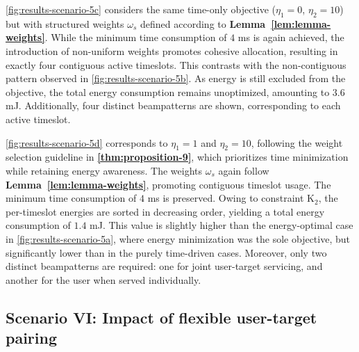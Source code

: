 \documentclass[10pt,journal,compsoc]{IEEEtran}
\theoremstyle{myremark}
\theoremstyle{myexample}
\begin{document}
 


\cref{fig:results-scenario-5c} considers the same time-only objective ($ \eta_1 = 0 $, $ \eta_2 = 10 $) but with structured weights $ \omega_s $ defined according to \textbf{Lemma~\ref{lem:lemma-weights}}. While the minimum time consumption of $ 4 $ ms is again achieved, the introduction of non-uniform weights promotes cohesive allocation, resulting in exactly four contiguous active timeslots. This contrasts with the non-contiguous pattern observed in \cref{fig:results-scenario-5b}. As energy is still excluded from the objective, the total energy consumption remains unoptimized, amounting to $ 3.6 $ mJ. Additionally, four distinct beampatterns are shown, corresponding to each active timeslot.


\cref{fig:results-scenario-5d} corresponds to $ \eta_1 = 1 $ and $ \eta_2 = 10 $, following the weight selection guideline in \textbf{\cref{thm:proposition-9}}, which prioritizes time minimization while retaining energy awareness. The weights $ \omega_s $ again follow \textbf{Lemma~\ref{lem:lemma-weights}}, promoting contiguous timeslot usage. The minimum time consumption of $ 4 $ ms is preserved. Owing to constraint $ \mathrm{K}_{2} $, the per-timeslot energies are sorted in decreasing order, yielding a total energy consumption of $ 1.4 $ mJ. This value is slightly higher than the energy-optimal case in \cref{fig:results-scenario-5a}, where energy minimization was the sole objective, but significantly lower than in the purely time-driven cases. Moreover, only two distinct beampatterns are required: one for joint user-target servicing, and another for the user when served individually.

 



\subsection{Scenario VI: Impact of flexible user-target pairing}
\end{document}

